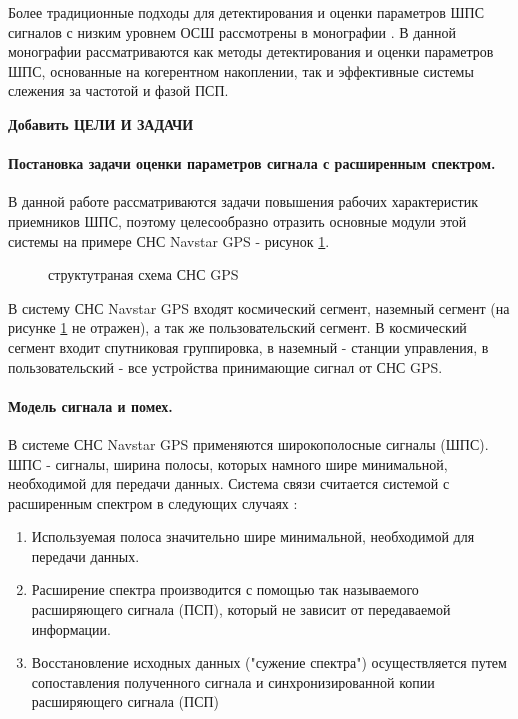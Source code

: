 Более традиционные подходы для детектирования и оценки параметров ШПС сигналов с низким уровнем ОСШ рассмотрены в монографии \cite{ziedan-book}.
В данной монографии рассматриваются как методы детектирования и оценки параметров ШПС, основанные на когерентном накоплении, так и эффективные
системы слежения за частотой и фазой ПСП.

{\bf{Добавить ЦЕЛИ И ЗАДАЧИ}}

\paragraph{Постановка задачи оценки параметров сигнала с расширенным спектром.}
В данной работе рассматриваются задачи повышения рабочих характеристик приемников ШПС, поэтому целесообразно отразить основные модули этой системы 
на примере СНС Navstar GPS - рисунок \ref{pic:sec1_gnss_system}.
\begin{figure}[H]
\center{}
\caption{структутраная схема СНС GPS}
\label{pic:sec1_gnss_system}
\end{figure}

В систему СНС Navstar GPS входят космический сегмент, наземный сегмент (на рисунке \ref{pic:sec1_gnss_system} не
отражен), а так же пользовательский сегмент. В космический сегмент входит спутниковая группировка, в 
наземный - станции управления, в пользовательский - все устройства принимающие сигнал от СНС GPS.

\paragraph{Модель сигнала и помех.}
В системе СНС Navstar GPS применяются широкополосные сигналы (ШПС).
ШПС - сигналы, ширина полосы, которых намного шире минимальной, необходимой для передачи данных.
Система связи считается системой с расширенным спектром в следующих случаях \cite{sklyar}:
\begin{enumerate}
	\item Используемая полоса значительно шире минимальной, необходимой для передачи данных.
	\item Расширение спектра производится с помощью так называемого расширяющего сигнала (ПСП),
		который не зависит от передаваемой информации.
	\item Восстановление исходных данных ("сужение спектра") осуществляется путем сопоставления полученного
		сигнала и синхронизированной копии расширяющего сигнала (ПСП)
\end{enumerate}

